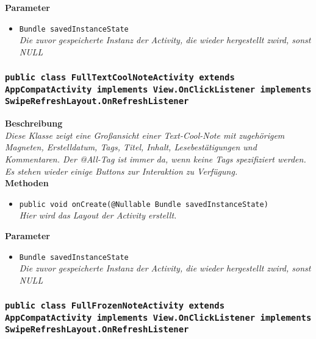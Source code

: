                 \textbf{Parameter}
                \begin{itemize}
        		\item\texttt{Bundle savedInstanceState}\\  
                \textit{Die zuvor gespeicherte Instanz der Activity, die wieder hergestellt zwird, sonst NULL}\\
                \end{itemize} 
                
       	\subsubsection{\texttt{public class FullTextCoolNoteActivity extends AppCompatActivity implements View.OnClickListener implements SwipeRefreshLayout.OnRefreshListener}}
               
               	\textbf{Beschreibung} \\
      	        \textit{Diese Klasse zeigt eine Großansicht einer Text-Cool-Note mit zugehörigem Magneten, Erstelldatum, Tags, Titel, Inhalt, Lesebestätigungen und Kommentaren. Der @All-Tag ist immer da, wenn keine Tags spezifiziert werden. Es stehen wieder einige Buttons zur Interaktion zu Verfügung.} \\
                
                \textbf{Methoden}
                \begin{itemize}
        		\item\texttt{{public void onCreate(@Nullable Bundle savedInstanceState)}}\\
                \textit{Hier wird das Layout der Activity erstellt.}\\
                \end{itemize}
                
                \textbf{Parameter}
                \begin{itemize}
        		\item\texttt{Bundle savedInstanceState}\\ 
                \textit{Die zuvor gespeicherte Instanz der Activity, die wieder hergestellt zwird, sonst NULL}\\
                \end{itemize} 
                
      	\subsubsection{\texttt{public class FullFrozenNoteActivity extends AppCompatActivity implements View.OnClickListener implements SwipeRefreshLayout.OnRefreshListener}}
               
